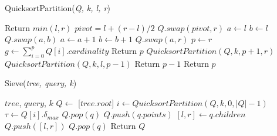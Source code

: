 \begin{algorithm} %
    \caption{QuicksortPartition(\emph{Q, k, l, r})} %
    \label{alg:quicksort-partition} %
    \begin{algorithmic}[5] %
            \STATE Return $min(l, r)$
        \ELSE 
            \STATE $pivot = l + (r - l) / 2$
            \STATE $Q.swap(pivot, r)$
            \STATE $a \leftarrow l$
            \STATE $b \leftarrow l$
                    \STATE $Q.swap(a, b)$
                    \STATE $a \leftarrow a + 1$
                \ENDIF
                \STATE $b \leftarrow b + 1$
            \ENDWHILE
            \STATE $Q.swap(a, r)$
            \STATE $p \leftarrow r$
            \STATE $g \leftarrow \sum_{i=0}^{p} Q[i].cardinality$
                \STATE Return $p$
                \STATE $QuicksortPartition(Q, k, p + 1, r)$
            \ELSE 
                    \STATE $QuicksortPartition(Q, k, l, p - 1)$
                    \STATE Return $p - 1$
                \ELSE
                    \STATE Return $p$
                \ENDIF
            \ENDIF
        \ENDIF
    \end{algorithmic}
    \end{algorithm}

\begin{algorithm} %
    \caption{Sieve(\emph{tree, query, k})} %
    \label{alg:sieve} %
    \begin{algorithmic}[6] %
        \REQUIRE $tree$, $query$, $k$
        \STATE $Q \leftarrow$ [$tree.root$]
            \STATE $i \leftarrow QuicksortPartition(Q, k, 0, |Q| - 1)$
            \STATE $\tau \leftarrow Q[i].\delta_{max}$
                    \STATE $Q.pop(q)$
                \ENDIF
            \ENDFOR
                    \STATE $Q.push(q.points)$
                \ELSE
                    \STATE $[l, r] \leftarrow q.children$
                    \STATE $Q.push([l, r])$   
                \ENDIF
                \STATE $Q.pop(q)$
            \ENDFOR 
        \ENDWHILE
        \STATE Return $Q$
    \end{algorithmic}
    \end{algorithm}

